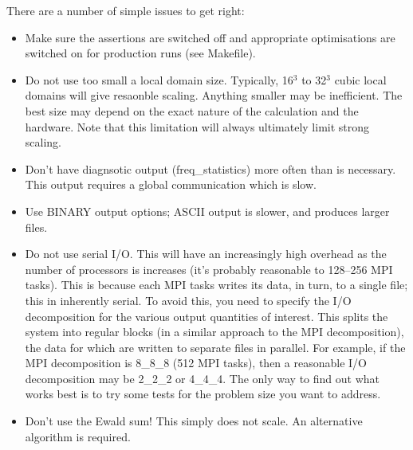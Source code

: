 There are a number of simple issues to get right:
\begin{itemize}
\item
Make sure the assertions are switched off and appropriate optimisations
are switched on for production runs (see Makefile).
\item
Do not use too small a local domain size. Typically, 16$^3$ to 32$^3$
cubic local domains will give resaonble scaling. Anything smaller may
be inefficient. The best size may depend on the exact nature of the
calculation and the hardware. Note that this limitation will always
ultimately limit strong scaling.
\item
Don't have diagnsotic output (freq\_statistics) more often than is
necessary. This output requires a global communication which is slow.
\item
Use BINARY output options; ASCII output is slower, and produces larger
files.
\item
Do not use serial I/O. This will have an increasingly high overhead as
the number of processors is increases (it's probably reasonable to
128--256 MPI tasks). This is because each MPI tasks writes its data,
in turn, to a single file; this in inherently serial. To avoid this,
you need to specify the I/O decomposition for the various output
quantities of interest. This splits the system into regular blocks
(in a similar approach to the MPI decomposition), the data for which
are written to separate files in parallel. For example, if the MPI
decomposition is 8\_8\_8 (512 MPI tasks), then a reasonable I/O
decomposition may be 2\_2\_2 or 4\_4\_4. The only way to find out
what works best is to try some tests for the problem size you want to
address.
\item
Don't use the Ewald sum! This simply does not scale.
An alternative algorithm is required.
\end{itemize}
